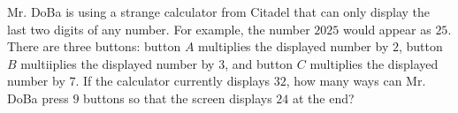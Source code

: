 Mr. DoBa is using a strange calculator from Citadel that can only display the last two digits of any number. For example, the number $2025$ would appear as $25$. There are three buttons: button $A$ multiplies the displayed number by $2$, button $B$ multiiplies the displayed number by $3$, and button $C$ multiplies the displayed number by $7$. If the calculator currently displays $32$, how many ways can Mr. DoBa press $9$ buttons so that the screen displays $24$ at the end?
